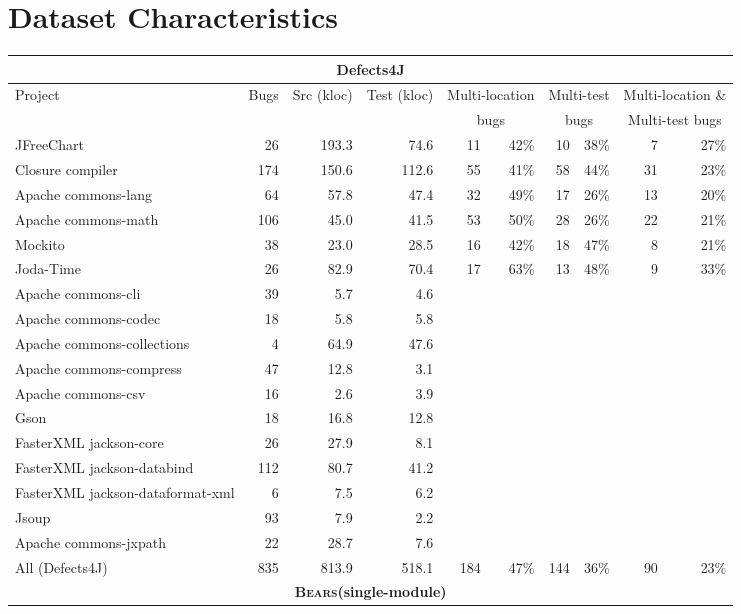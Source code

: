 \documentclass[10pt, conference]{IEEEtran}
\newcommand\bears{\textsc{Bears}\xspace}
\begin{document}
\section{Dataset Characteristics}
\label{sec:data-rq1}

\begin{table*}
\begin{center}
\begin{tabular}{l  rrr | rr | rr | rr}
\toprule
\multicolumn{10}{c}{\textbf{Defects4J}} \\
\midrule
Project & Bugs & Src (kloc) & Test (kloc) & \multicolumn{2}{c}{Multi-location} 
		& \multicolumn{2}{c}{Multi-test} & \multicolumn{2}{c}{Multi-location \&}\\
&&&&\multicolumn{2}{c}{bugs}&\multicolumn{2}{c}{bugs}&\multicolumn{2}{c}{Multi-test bugs}\\
\midrule
JFreeChart  & 26 & 193.3 & 74.6  & 11 & 42\% & 10 & 38\% & 7 & 27\%\\
Closure compiler & 174 & 150.6 & 112.6 & 55 & 41\% & 58 & 44\% & 31 & 23\%\\
Apache commons-lang & 64 & 57.8 & 47.4  & 32 & 49\% & 17 & 26\% & 13 & 20\%\\
Apache commons-math & 106 & 45.0 & 41.5 & 53 & 50\% & 28 & 26\% & 22 & 21\%\\
Mockito & 38 & 23.0 & 28.5 & 16 & 42\% & 18 & 47\% & 8 & 21\%\\
Joda-Time & 26 & 82.9 & 70.4 & 17 & 63\% & 13 & 48\% & 9 & 33\%\\
Apache commons-cli & 39 & 5.7 & 4.6 \\
Apache commons-codec & 18 & 5.8 & 5.8 \\
Apache commons-collections & 4 & 64.9 & 47.6 \\
Apache commons-compress & 47 & 12.8 & 3.1 \\ 
Apache commons-csv & 16 & 2.6 & 3.9 \\
Gson & 18 & 16.8 & 12.8 \\
FasterXML jackson-core & 26 & 27.9 & 8.1 \\
FasterXML jackson-databind & 112 & 80.7 & 41.2 \\
FasterXML jackson-dataformat-xml & 6 & 7.5 & 6.2 \\
Jsoup & 93 & 7.9 & 2.2 \\
Apache commons-jxpath & 22 & 28.7 & 7.6 \\
\midrule
All (Defects4J) & 835 & 813.9 & 518.1 & 184 & 47\% & 144 & 36\% & 90 & 23\%\\
\midrule
\multicolumn{10}{c}{\textbf{\bears (single-module)}} \\

\end{tabular}
\end{center}
\end{table*}
\end{document}
